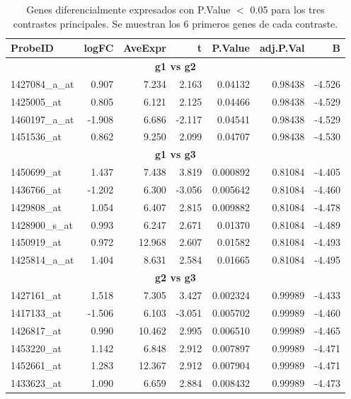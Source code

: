 \documentclass[12pt,a4paper]{article}
\begin{document}
\begin{table}[ht]
\centering
\caption{Genes diferencialmente expresados con P.Value $<$ 0.05 para los tres contrastes principales. Se muestran los 6 primeros genes de cada contraste.}
\begin{tabular}{lrrrrrr}
\toprule
\textbf{ProbeID} & \textbf{logFC} & \textbf{AveExpr} & \textbf{t} & \textbf{P.Value} & \textbf{adj.P.Val} & \textbf{B} \\
\midrule
\multicolumn{7}{c}{\textbf{g1 vs g2}} \\
1427084\_a\_at & 0.907 & 7.234 & 2.163 & 0.04132 & 0.98438 & -4.526 \\
1425005\_at & 0.805 & 6.121 & 2.125 & 0.04466 & 0.98438 & -4.529 \\
1460197\_a\_at & -1.908 & 6.686 & -2.117 & 0.04541 & 0.98438 & -4.529 \\
1451536\_at & 0.862 & 9.250 & 2.099 & 0.04707 & 0.98438 & -4.530 \\
\midrule
\multicolumn{7}{c}{\textbf{g1 vs g3}} \\
1450699\_at & 1.437 & 7.438 & 3.819 & 0.000892 & 0.81084 & -4.405 \\
1436766\_at & -1.202 & 6.300 & -3.056 & 0.005642 & 0.81084 & -4.460 \\
1429808\_at & 1.054 & 6.407 & 2.815 & 0.009882 & 0.81084 & -4.478 \\
1428900\_s\_at & 0.993 & 6.247 & 2.671 & 0.01370 & 0.81084 & -4.489 \\
1450919\_at & 0.972 & 12.968 & 2.607 & 0.01582 & 0.81084 & -4.493 \\
1425814\_a\_at & 1.404 & 8.631 & 2.584 & 0.01665 & 0.81084 & -4.495 \\
\midrule
\multicolumn{7}{c}{\textbf{g2 vs g3}} \\
1427161\_at & 1.518 & 7.305 & 3.427 & 0.002324 & 0.99989 & -4.433 \\
1417133\_at & -1.506 & 6.103 & -3.051 & 0.005702 & 0.99989 & -4.460 \\
1426817\_at & 0.990 & 10.462 & 2.995 & 0.006510 & 0.99989 & -4.465 \\
1453220\_at & 1.142 & 6.848 & 2.912 & 0.007897 & 0.99989 & -4.471 \\
1452661\_at & 1.283 & 12.367 & 2.912 & 0.007904 & 0.99989 & -4.471 \\
1433623\_at & 1.090 & 6.659 & 2.884 & 0.008432 & 0.99989 & -4.473 \\
\bottomrule
\end{tabular}
\end{table}
\end{document}
